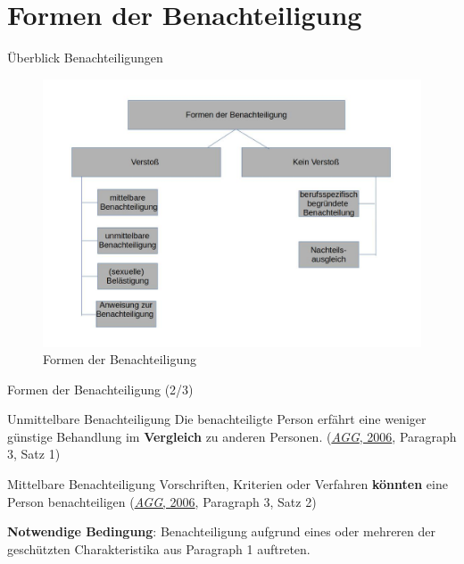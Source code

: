 \documentclass[
  10pt,
  ignorenonframetext,
]{beamer}
\begin{document}
\hypertarget{formen-der-benachteiligung}{%
\section{Formen der Benachteiligung}\label{formen-der-benachteiligung}}

\begin{frame}{Überblick Benachteiligungen}
\protect\hypertarget{uxfcberblick-benachteiligungen}{}
\begin{figure}
\centering
\includegraphics[width=\textwidth,height=0.75\textheight]{plots/benachteiligung.jpg}
\caption{Formen der Benachteiligung}
\end{figure}
\end{frame}

\begin{frame}{Formen der Benachteiligung (2/3)}
\protect\hypertarget{formen-der-benachteiligung-23}{}
\begin{block}{Unmittelbare Benachteiligung}
\protect\hypertarget{unmittelbare-benachteiligung}{}
Die benachteiligte Person erfährt eine weniger günstige Behandlung im
\textbf{Vergleich} zu anderen Personen.
(\protect\hyperlink{ref-agg}{\emph{AGG}, 2006}, Paragraph 3, Satz 1)
\end{block}

\begin{block}{Mittelbare Benachteiligung}
\protect\hypertarget{mittelbare-benachteiligung}{}
Vorschriften, Kriterien oder Verfahren \textbf{könnten} eine Person
benachteiligen (\protect\hyperlink{ref-agg}{\emph{AGG}, 2006}, Paragraph
3, Satz 2)~

\textbf{Notwendige Bedingung}: Benachteiligung aufgrund eines oder
mehreren der geschützten Charakteristika aus Paragraph 1 auftreten.
\end{block}
\end{frame}
\end{document}
